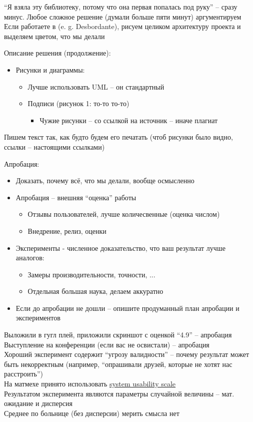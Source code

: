 ``Я взяла эту библиотеку, потому что она первая попалась под руку'' -- сразу минус. Любое сложное решение (думали больше пяти минут) аргументируем \\
Если работаете в (e. g. Desbordante), рисуем целиком архитектуру проекта и выделяем цветом, что мы делали

Описание решения (продолжение):
\begin{itemize}
	\item Рисунки и диаграммы:
	\begin{itemize}
		\item Лучше использовать UML -- он стандартный
		\item Подписи (рисунок 1: то-то то-то)
		\begin{itemize}
			\item Чужие рисунки -- со ссылкой на источник -- иначе плагиат
		\end{itemize}
	\end{itemize}
\end{itemize}

Пишем текст так, как будто будем его печатать (чтоб рисунки было видно, ссылки -- настоящими ссылками)

Апробация:
\begin{itemize}
	\item Доказать, почему всё, что мы делали, вообще осмысленно
	\item Апробация -- внешняя ``оценка'' работы
	\begin{itemize}
		\item Отзывы пользователей, лучше количесвенные (оценка числом)
		\item Внедрение, релиз, оценки
	\end{itemize}
	\item Эксперименты - численное доказательство, что ваш результат лучше аналогов:
	\begin{itemize}
		\item Замеры производительности, точности, ...
		\item Отдельная большая наука, делаем аккуратно
	\end{itemize}
	\item Если до апробации не дошли -- опишите продуманный план апробации и экспериментов
\end{itemize}

Выложили в гугл плей, приложили скриншот с оценкой ``4.9'' -- апробация \\
Выступление на конференции (если вас не освистали) -- апробация \\
Хороший эксперимент содержит ``угрозу валидности'' -- почему результат может быть некорректным (например, ``опрашивали друзей, которые не хотят нас расстроить'') \\
На матмехе принято использовать \href{https://www.usability.gov/how-to-and-tools/methods/system-usability-scale.html}{system usability scale} \\
Результатом эксперимента являются параметры случайной величины -- мат. ожидание и дисперсия \\
Среднее по больнице (без дисперсии) мерить смысла нет

